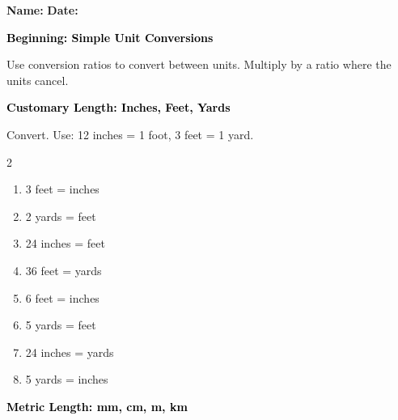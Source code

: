 \documentclass[12pt, letterpaper, fleqn]{article}
\newcommand{\blank}{\underline{\hspace{2.2cm}}}
\begin{document}
\textbf{Name:} \underline{\hspace{5cm}}
\hfill
\textbf{Date:} \underline{\hspace{3cm}}\\

\begin{tcolorbox}[colback=customteal!20]
    \large\textcolor{black}{\textbf{Beginning: Simple Unit Conversions}}
\end{tcolorbox}

\vspace{3mm}

\noindent
Use conversion ratios to convert between units. Multiply by a ratio where the units cancel.

\vspace{4mm}

\begin{tcolorbox}[colback=customteal!20]
\large\textcolor{black}{\textbf{Customary Length: Inches, Feet, Yards}}
\end{tcolorbox}

\noindent
Convert. Use: 12 inches = 1 foot, 3 feet = 1 yard.

\vspace{3mm}

\begin{multicols}{2}
\begin{enumerate}[itemsep=3cm, leftmargin=0.6cm]
\item 3 feet = \blank \; inches
\item 2 yards = \blank \; feet
\item 24 inches = \blank \; feet
\item 36 feet = \blank \; yards
\item 6 feet = \blank \; inches
\item 5 yards = \blank \; feet
\item 24 inches = \blank \; yards
\item 5 yards = \blank \; inches
\end{enumerate}
\end{multicols}

\newpage

\begin{tcolorbox}[colback=customteal!20]
\large\textcolor{black}{\textbf{Metric Length: mm, cm, m, km}}
\end{tcolorbox}
\end{document}

